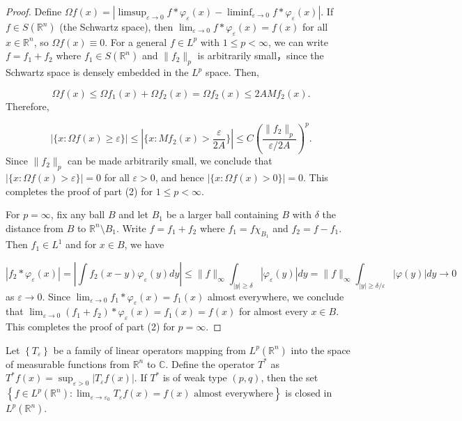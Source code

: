 \begin{proof}
Define $\Omega f(x) = |\limsup_{\varepsilon \rightarrow 0} f * \varphi_{\varepsilon}(x) - \liminf_{\varepsilon \rightarrow 0} f * \varphi_{\varepsilon}(x)|$. If $f \in S(\mathbb{R}^n)$ (the Schwartz space), then $\lim_{\varepsilon \rightarrow 0} f * \varphi_{\varepsilon}(x) = f(x)$ for all $x \in \mathbb{R}^n$, so $\Omega f(x) \equiv 0$. For a general $f \in L^p$ with $1 \leqslant p < \infty$, we can write $f = f_1 + f_2$ where $f_1 \in S(\mathbb{R}^n)$ and $\|f_2\|_p$ is arbitrarily small，since the Schwartz space is densely embedded in the $L^p$ space. Then,

$$\Omega f(x) \leqslant \Omega f_1(x) + \Omega f_2(x) = \Omega f_2(x) \leqslant 2A Mf_2(x).$$Therefore,

$$|\{x: \Omega f(x) \geqslant \varepsilon\}| \leqslant |\{x: Mf_2(x) > \frac{\varepsilon}{2A}\}| \leqslant C \left(\frac{\|f_2\|_p}{\varepsilon / 2A}\right)^p.$$Since $\|f_2\|_p$ can be made arbitrarily small, we conclude that $|\{x: \Omega f(x) > \varepsilon\}| = 0$ for all $\varepsilon > 0$, and hence $|\{x: \Omega f(x) > 0\}| = 0$. This completes the proof of part (2) for $1 \leqslant p < \infty$.

For $p = \infty$, fix any ball $B$ and let $B_1$ be a larger ball containing $B$ with $\delta$ the distance from $B$ to $\mathbb{R}^n \setminus B_1$. Write $f = f_1 + f_2$ where $f_1 = f \chi_{B_1}$ and $f_2 = f - f_1$. Then $f_1 \in L^1$ and for $x \in B$, we have

$$|f_2 * \varphi_{\varepsilon}(x)| = \left|\int f_2(x-y) \varphi_{\varepsilon}(y) dy\right| \leqslant \|f\|_{\infty} \int_{|y| \geqslant \delta} |\varphi_{\varepsilon}(y)| dy = \|f\|_{\infty} \int_{|y| \geqslant \delta/\varepsilon} |\varphi(y)| dy \rightarrow 0$$as $\varepsilon \rightarrow 0$. Since $\lim_{\varepsilon \rightarrow 0} f_1 * \varphi_{\varepsilon}(x) = f_1(x)$ almost everywhere, we conclude that $\lim_{\varepsilon \rightarrow 0} (f_1 + f_2) * \varphi_{\varepsilon}(x) = f_1(x) = f(x)$ for almost every $x \in B$. This completes the proof of part (2) for $p = \infty$.
\end{proof}
\begin{theorem}
    Let $\left\{T_\varepsilon\right\}$ be a family of linear operators mapping from $L^p\left(\mathbb{R}^n\right)$ into the space of measurable functions from $\mathbb{R}^n$ to $\mathbb{C}$. Define the operator $T^*$ as $T^* f(x)=\sup _{\varepsilon>0}\left|T_{\varepsilon} f(x)\right|$. If $T^*$ is of weak type $(p, q)$, then the set $\left\{f \in L^p\left(\mathbb{R}^n\right): \lim _{\varepsilon \rightarrow \varepsilon_0} T_{\varepsilon} f(x)=f(x) \text{ almost everywhere}\right\}$ is closed in $L^p\left(\mathbb{R}^n\right)$.
\end{theorem}
